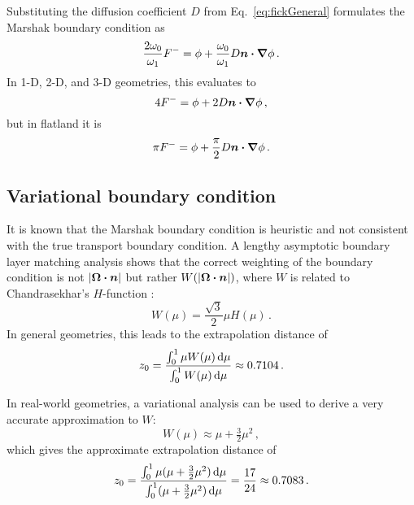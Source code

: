 Substituting the diffusion coefficient $D$ from Eq.~\eqref{eq:fickGeneral}
formulates the Marshak boundary condition as
\begin{equation*}
\frac{2\omega_0}{\omega_1} F^{-}
= \phi + \frac{\omega_0}{\omega_1} D \bm{n} \bm{\cdot} \bm{\nabla} \phi\,.
\end{equation*}
In 1-D, 2-D, and 3-D geometries, this evaluates to
\begin{equation*}
4 F^{-}
= \phi + 2 D \bm{n} \bm{\cdot} \bm{\nabla} \phi\,,
\end{equation*}
but in flatland it is
\begin{equation*}
\pi F^{-}
= \phi + \frac{\pi}{2} D \bm{n} \bm{\cdot} \bm{\nabla} \phi\,.
\end{equation*}

\subsection{Variational boundary condition} \label{sec:varBndy}
It is known that the Marshak boundary condition is heuristic and not consistent with the
true transport boundary condition. A lengthy asymptotic boundary layer
matching analysis \cite{Hab1975} shows that the correct weighting of the
boundary condition is not $\left| \bm{\Omega}\bm{\cdot}\bm{n} \right|$ but rather
$W(\left| \bm{\Omega}\bm{\cdot}\bm{n} \right|)$, where $W$ is related to Chandrasekhar's
$H$-function \cite{Cha1960}:
\begin{equation} \label{eq:chandraW}
  W(\mu) = \frac{\sqrt{3}}{2} \mu H(\mu) \,.
\end{equation}
In general geometries, this leads to the extrapolation distance of
\begin{align*}
  z_0 = \frac{\int_{0}^{1} \mu W(\mu) \mathop{}\!\mathrm{d} \mu}{\int_{0}^{1} W(\mu) \mathop{}\!\mathrm{d}
  \mu} \approx 0.7104\,.
\end{align*}

In real-world geometries, a variational analysis \cite{Mal1991} can be used to
derive a very accurate approximation to $W$:
\begin{equation*}
W(\mu) \approx \mu + \tfrac{3}{2} \mu^2 \,,
\end{equation*}
which gives the approximate extrapolation distance of
\begin{equation*}
  z_0 = \frac{\int_{0}^{1} \mu (\mu + \tfrac{3}{2} \mu^2 ) \mathop{}\!\mathrm{d}
  \mu}{\int_{0}^{1} (\mu + \tfrac{3}{2} \mu^2 ) \mathop{}\!\mathrm{d} \mu} 
  = \frac{17}{24} \approx 0.7083 \,.
\end{equation*}

